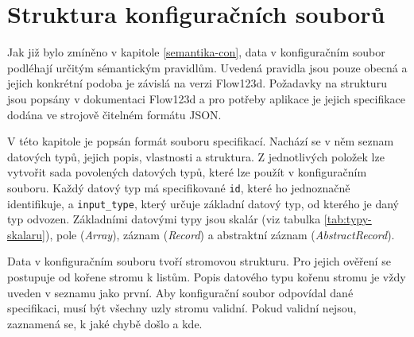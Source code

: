 \documentclass[FM,MP]{tulthesis}
\begin{document}
\chapter{Struktura konfiguračních souborů}
	\label{struktura-konf-souboru}
	Jak již bylo zmíněno v kapitole \ref{semantika-con}, data v konfiguračním soubor podléhají určitým sémantickým pravidlům. Uvedená pravidla jsou pouze obecná a jejich konkrétní podoba je závislá na verzi Flow123d. Požadavky na strukturu jsou popsány v dokumentaci Flow123d a pro potřeby aplikace je jejich specifikace dodána ve strojově čitelném formátu JSON.

	V této kapitole je popsán formát souboru specifikací. Nachází se v něm seznam datových typů, jejich popis, vlastnosti a struktura. Z jednotlivých položek lze vytvořit sada povolených datových typů, které lze použít v konfiguračním souboru. Každý datový typ má specifikované \texttt{id}, které ho jednoznačně identifikuje, a \texttt{input\_type}, který určuje základní datový typ, od kterého je daný typ odvozen. Základními datovými typy jsou skalár (viz tabulka \ref{tab:typy-skalaru}), pole (\textit{Array}), záznam (\textit{Record}) a abstraktní záznam (\textit{AbstractRecord}).

	Data v konfiguračním souboru tvoří stromovou strukturu. Pro jejich ověření se postupuje od kořene stromu k listům. Popis datového typu kořenu stromu je vždy uveden v seznamu jako první. Aby konfigurační soubor odpovídal dané specifikaci, musí být všechny uzly stromu validní. Pokud validní nejsou, zaznamená se, k jaké chybě došlo a kde.


\end{document}

